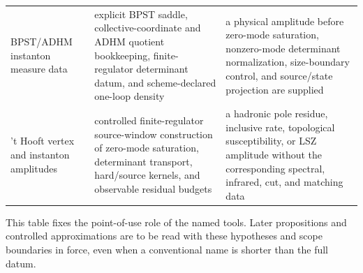 \begin{remark}
\begin{center}
\begin{tabular}{
  >{\raggedright\arraybackslash}p{}
  >{\raggedright\arraybackslash}p{}
  >{\raggedright\arraybackslash}p{}}
BPST/ADHM instanton measure data
& explicit BPST saddle, collective-coordinate and ADHM quotient bookkeeping,
  finite-regulator determinant datum, and scheme-declared one-loop density
& a physical amplitude before zero-mode saturation, nonzero-mode determinant
  normalization, size-boundary control, and source/state projection are
  supplied \\
't Hooft vertex and instanton amplitudes
& controlled finite-regulator source-window construction of zero-mode
  saturation, determinant transport, hard/source kernels, and observable
  residual budgets
& a hadronic pole residue, inclusive rate, topological susceptibility, or LSZ
  amplitude without the corresponding spectral, infrared, cut, and matching
  data \\
\hline
\end{tabular}
\end{center}
This table fixes the point-of-use role of the named tools.  Later
propositions and controlled approximations are to be read with these
hypotheses and scope boundaries in force, even when a conventional name is
shorter than the full datum.
\end{remark}

